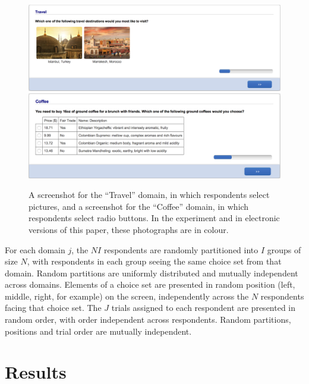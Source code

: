 \documentclass[11pt,letter]{article}
\begin{document}
\begin{figure}
	\begin{center}
	\includegraphics[width=15cm]{Population_study_design/screenshot_Travel.png}
	\includegraphics[width=15cm]{Population_study_design/screenshot_Coffee.png}
	\caption{A screenshot for the ``Travel'' domain, in which respondents select pictures, and a screenshot for the ``Coffee'' domain, in which respondents select radio buttons. In the experiment and in electronic versions of this paper, these photographs are in colour.}\label{f:screenshots}
	\end{center}
\end{figure}

For each domain $j$, the $NI$ respondents are randomly partitioned into $I$ groups of size $N$, with respondents in each group seeing the same choice set from that domain.
Random partitions are uniformly distributed and mutually independent across domains.
Elements of a choice set are presented in random position (left, middle, right, for example) on the screen, independently across the $N$ respondents facing that choice set.
The $J$ trials assigned to each respondent are presented in random
order, with order independent across respondents.
Random partitions, positions and trial order are mutually independent.

\section{Results}\label{s:results}
\end{document}

